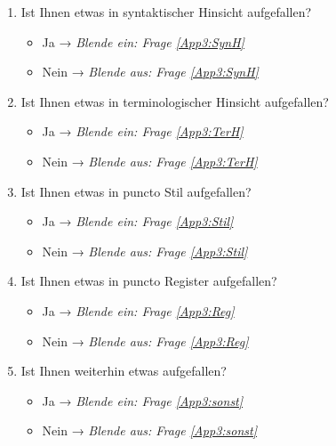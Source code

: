 \begin{enumerate}[resume]
\item Ist Ihnen etwas in syntaktischer Hinsicht aufgefallen?

    \begin{itemize}
		\item[\Circle] Ja → \textit{Blende ein: Frage \ref{App3:SynH}}
        \item[\Circle] Nein → \textit{Blende aus: Frage \ref{App3:SynH}}
    \end{itemize}        


\item Ist Ihnen etwas in terminologischer Hinsicht aufgefallen?

    \begin{itemize}
		\item[\Circle] Ja → \textit{Blende ein: Frage \ref{App3:TerH}}
        \item[\Circle] Nein → \textit{Blende aus: Frage \ref{App3:TerH}}
    \end{itemize}

\item Ist Ihnen etwas in puncto Stil aufgefallen?

    \begin{itemize}
		\item[\Circle] Ja → \textit{Blende ein: Frage \ref{App3:Stil}}
        \item[\Circle] Nein → \textit{Blende aus: Frage \ref{App3:Stil}}
    \end{itemize}


\item Ist Ihnen etwas in puncto Register aufgefallen?

    \begin{itemize}
		\item[\Circle] Ja → \textit{Blende ein: Frage \ref{App3:Reg}}
        \item[\Circle] Nein → \textit{Blende aus: Frage \ref{App3:Reg}}
    \end{itemize}

\item Ist Ihnen weiterhin etwas aufgefallen?

    \begin{itemize}
		\item[\Circle] Ja → \textit{Blende ein: Frage \ref{App3:sonst}}
        \item[\Circle] Nein → \textit{Blende aus: Frage \ref{App3:sonst}}
    \end{itemize}
\end{enumerate}



